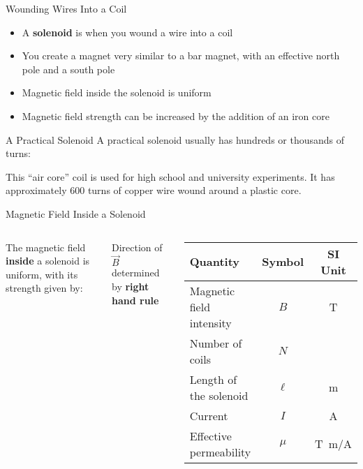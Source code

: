 \documentclass[12pt,aspectratio=169]{beamer}
\begin{document}
\begin{frame}{Wounding Wires Into a Coil}
  \begin{itemize}
  \item A \textbf{solenoid} is when you wound a wire into a coil
  \item You create a magnet very similar to a bar magnet, with an effective
    north pole and a south pole
  \item Magnetic field inside the solenoid is uniform
  \item Magnetic field strength can be increased by the addition of an iron core
  \end{itemize}
  \begin{center}
  \end{center}
\end{frame}



\begin{frame}{A Practical Solenoid}
  A practical solenoid usually has hundreds or thousands of turns:
  \begin{center}
  \end{center}

  \vspace{-.2in}
  This ``air core'' coil is used for high school and university experiments. It
  has approximately 600 turns of copper wire wound around a plastic core.
\end{frame}



\begin{frame}{Magnetic Field Inside a Solenoid}
  \begin{columns}
    
    The magnetic field \textbf{inside} a solenoid is uniform, with its strength
    given by:
    
    
    Direction of $\vec B$ determined by \textbf{right hand rule}
    \begin{center}
      \begin{tabular}{l|c|c}
        \rowcolor{pink}
        \textbf{Quantity} & \textbf{Symbol} & \textbf{SI Unit} \\ \hline
        Magnetic field intensity & $B$    & \si{\tesla} \\
        Number of coils          & $N$    & \\
        Length of the solenoid   & $\ell$ & \si{\metre}\\
        Current                  & $I$    & \si{\ampere}\\
        Effective permeability   & $\mu$  & \si{T.m/A}
      \end{tabular}
    \end{center}
  \end{columns}
\end{frame}
\end{document}
